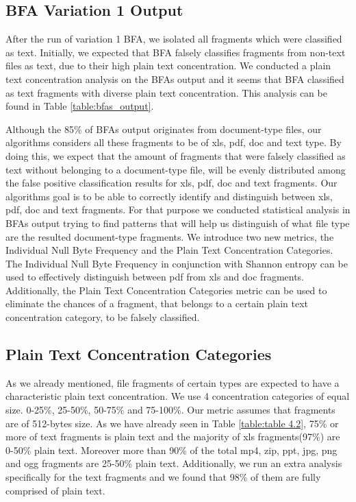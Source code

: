 \subsection{BFA Variation 1 Output}
After the run of variation 1 BFA, we isolated all fragments which were classified as text. Initially, we expected that BFA falsely classifies fragments from non-text files as text, due to their high plain text concentration. We conducted a plain text concentration analysis on the BFAs output and it seems that BFA classified as text fragments with diverse plain text concentration. This analysis can be found in Table \ref{table:bfas_output}.


 Although the 85\% of BFAs output  originates from document-type files, our algorithms considers all these fragments to be of xls, pdf, doc and text type. By doing this, we expect that the amount of fragments that were falsely classified as text without belonging to a document-type file, will be evenly distributed among the false positive classification results for xls, pdf, doc and text fragments. Our algorithms goal is to be able to correctly identify and distinguish between xls, pdf, doc and text fragments. For that purpose we conducted statistical analysis in BFAs output trying to find patterns that will help us distinguish of what file type are the resulted document-type fragments. We introduce two new metrics, the Individual Null Byte Frequency and the Plain Text Concentration Categories.  The Individual Null Byte Frequency in conjunction with Shannon entropy\cite{Shannon} can be used to effectively distinguish  between pdf from xls and doc fragments. Additionally, the Plain Text Concentration Categories metric can be used to eliminate the chances of a fragment, that belongs to a certain plain text concentration category, to be falsely classified.
 
 \subsection{Plain Text Concentration Categories}
As we already mentioned, file fragments of certain types are expected to have a characteristic plain text concentration. We use 4 concentration categories of equal size. 0-25\%, 25-50\%, 50-75\% and 75-100\%. Our metric assumes that fragments are of 512-bytes size. As we have already seen in Table \ref{table:table 4.2}, 75\% or more of text fragments is plain text and the majority of xls fragments(97\%) are 0-50\% plain text. Moreover more than 90\% of the total mp4, zip, ppt, jpg, png and ogg fragments are 25-50\% plain text. Additionally, we run an extra analysis specifically for the text fragments and we found that 98\% of them are fully comprised of plain text.

